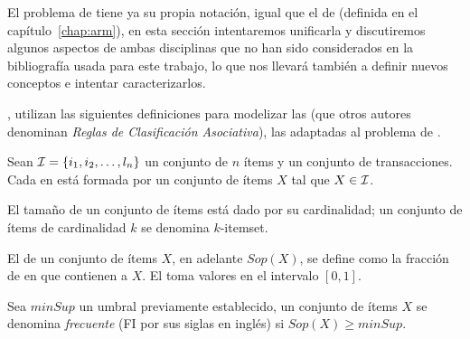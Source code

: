 El problema de \Clasificacion tiene ya su propia notación, igual que el de \arm (definida en el capítulo~\ref{chap:arm}), en esta sección intentaremos unificarla y discutiremos algunos aspectos de ambas disciplinas que no han sido considerados en la bibliografía usada para este trabajo, lo que nos llevará también a definir nuevos conceptos e intentar caracterizarlos.




\cite{HLeonCarrascoHPalancarMTrinidad-DesarrolloDeClasificadoresBasadosEnRA-2010}, utilizan las siguientes definiciones para modelizar las \CAR (que otros autores denominan \emph{Reglas de Clasificación Asociativa}), las \ars adaptadas al problema de \Clasificacion.

Sean $\I = \{i_1,i_2,\ldots,l_n\}$ un conjunto de $n$ ítems y \T un conjunto de transacciones. Cada \transaccion en \T está formada por un conjunto de ítems $X$ tal que $X\in\I$.
\begin{Definition}[\Itemset]
  El tamaño de un conjunto de ítems está dado por su cardinalidad; un conjunto de ítems de cardinalidad $k$ se denomina $k$-itemset.
\label{def:itemset}
\end{Definition}

\begin{Definition}[Soporte]
  El \soporte de un conjunto de ítems $X$, en adelante $Sop(X)$, se define como la fracción de \transacciones en \T que contienen a $X$. El \soporte toma valores en el intervalo $[0,1]$.
\label{def:soporte}
\end{Definition}

\begin{Definition}[$minSup$]
  Sea $minSup$ un umbral previamente establecido, un conjunto de ítems $X$ se denomina \emph{frecuente} (FI por sus siglas en inglés) si $Sop(X) \geq minSup$.
\label{def:flujo-de-datos}
\end{Definition}

